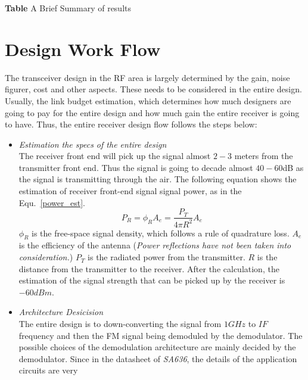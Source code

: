 \documentclass[]{article}
\begin{document}
\begin{center}
    \textbf{Table} A Brief Summary of results
\end{center}

\section{Design Work Flow}
The transceiver design in the RF area is largely determined by the gain, noise
figurer, cost and other aspects. These needs to be considered in the entire
design. Usually, the link budget estimation, which determines how much designers
are going to pay for the entire design and how much gain the entire receiver is
going to have.
Thus, the entire receiver design flow follows the steps below:
    \begin{itemize}
        \item \textit{Estimation the specs of the entire design} \\
            The receiver front end will pick up the signal almost $2-3$ meters
            from the transmitter front end. Thus the signal is going to decade
            almost $40-60$dB as the signal is transmitting through the air. The
            following equation shows the estimation of receiver front-end signal
            signal power, as in the Equ.~\ref{power_est}.
            \begin{equation}
                P_{R} = \phi_{R}A_{e}=\frac{P_{T}}{4\pi R^2}A_{e}
                \label{power_est}
            \end{equation}
            $\phi_{R}$ is the free-space signal density, which follows a rule of
            quadrature loss. $A_{e}$ is the efficiency of the antenna
            (\textit{Power reflections have not been taken into consideration.})
            $P_{T}$ is the radiated power from the transmitter. $R$ is the
            distance from the transmitter to the receiver. After the
            calculation, the estimation of the signal strength that can be
            picked up by the receiver is $-60dBm$.
        \item \textit{Architecture Desicision} \\
            The entire design is to down-converting the signal from $1GHz$ to
            $IF$ frequency and then the FM signal being demoduled by the
            demodulator. The possible choices of the demodulation architecture
            are mainly decided by the demodulator. Since in the datasheet of
            \textit{SA636}, the details of the application circuits are very

\end{itemize}
\end{document}
